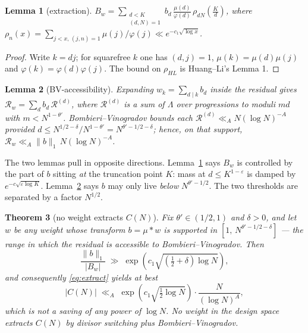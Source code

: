 \documentclass[11pt,a4paper]{article}
\theoremstyle{plain}
\newtheorem{theorem}{Theorem}
\newtheorem{lemma}[theorem]{Lemma}
\theoremstyle{definition}
\begin{document}
\begin{lemma}[extraction]\label{lem:extract}
$\displaystyle B_w=\sum_{\substack{d<K\\(d,N)=1}}b_d\,
 \frac{\mu(d)}{\varphi(d)}\,\rho_{dN}\!\left(\frac{K}{d}\right)$,
where $\rho_{n}(x)=\sum_{j<x,\,(j,n)=1}\mu(j)/\varphi(j)
 \ll e^{-c_1\sqrt{\log x}}$.
\end{lemma}

\begin{proof}
Write $k=dj$; for squarefree $k$ one has $(d,j)=1$,
$\mu(k)=\mu(d)\mu(j)$ and $\varphi(k)=\varphi(d)\varphi(j)$. The bound
on $\rho_{HL}$ is Huang--Li's Lemma 1.
\end{proof}

\begin{lemma}[BV-accessibility]\label{lem:bv}
Expanding $w_k=\sum_{d\mid k}b_d$ inside the residual gives
$\mathcal R_w=\sum_d b_d\,\mathcal R^{(d)}$, where $\mathcal R^{(d)}$
is a sum of $\Lambda$ over progressions to moduli $md$ with
$m<N^{1-\theta'}$. Bombieri--Vinogradov bounds each
$\mathcal R^{(d)}\ll_A N(\log N)^{-A}$ provided
$d\le N^{1/2-\delta}/N^{1-\theta'}=N^{\theta'-1/2-\delta}$; hence, on
that support, $\mathcal R_w\ll_A \|b\|_1\,N(\log N)^{-A}$.
\end{lemma}

The two lemmas pull in opposite directions. Lemma~\ref{lem:extract}
says $B_w$ is controlled by the part of $b$ sitting \emph{at} the
truncation point $K$: mass at $d\le K^{1-\varepsilon}$ is damped by
$e^{-c\sqrt{\varepsilon\log K}}$. Lemma~\ref{lem:bv} says $b$ may only
live \emph{below} $N^{\theta'-1/2}$. The two thresholds are separated
by a factor $N^{1/2}$.

\begin{theorem}[no weight extracts $C(N)$]\label{thm:D}
Fix $\theta'\in(1/2,1)$ and $\delta>0$, and let $w$ be any weight
whose transform $b=\mu*w$ is supported in
$[1,\,N^{\theta'-1/2-\delta}]$ --- the range in which the residual is
accessible to Bombieri--Vinogradov. Then
\[
  \frac{\|b\|_1}{|B_w|} \;\gg\;
   \exp\!\left(c_1\sqrt{(\tfrac12+\delta)\log N}\right),
\]
and consequently \eqref{eq:extract} yields at best
\[
  |C(N)| \;\ll_A\; \exp\!\left(c_1\sqrt{\tfrac12\log N}\right)
   \cdot \frac{N}{(\log N)^{A}},
\]
which is not a saving of any power of $\log N$. No weight in the
design space extracts $C(N)$ by divisor switching plus
Bombieri--Vinogradov.
\end{theorem}
\end{document}
